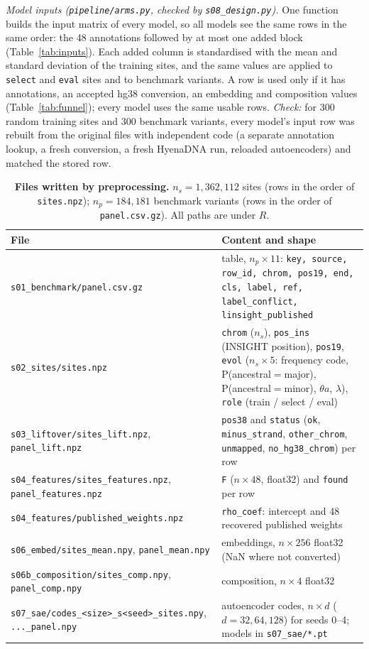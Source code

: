 \documentclass[11pt]{article}
\newcommand{\file}[1]{\nolinkurl{#1}}
\begin{document}
\emph{Model inputs (\file{pipeline/arms.py}, checked by \file{s08_design.py}).} One function builds the input
matrix of every model, so all models see the same rows in the same order: the 48 annotations followed by at
most one added block (Table~\ref{tab:inputs}). Each added column is standardised with the mean and standard
deviation of the training sites, and the same values are applied to \texttt{select} and \texttt{eval} sites
and to benchmark variants. A row is used only if it has annotations, an accepted hg38 conversion, an
embedding and composition values (Table~\ref{tab:funnel}); every model uses the same usable rows.
\emph{Check:} for 300 random training sites and 300 benchmark variants, every model's input row was rebuilt
from the original files with independent code (a separate annotation lookup, a fresh conversion, a fresh
HyenaDNA run, reloaded autoencoders) and matched the stored row.

\begin{table}[t]
\centering\footnotesize
\caption{\textbf{Files written by preprocessing.} $n_s=1{,}362{,}112$ sites (rows in the order of
\file{sites.npz}); $n_p=184{,}181$ benchmark variants (rows in the order of \file{panel.csv.gz}). All paths
are under $R$.}
\label{tab:files}
\begin{tabularx}{\textwidth}{@{}>{\raggedright\arraybackslash}p{4.9cm} >{\raggedright\arraybackslash}X@{}}
\toprule
File & Content and shape \\
\midrule
\file{s01_benchmark/panel.csv.gz} & table, $n_p\times11$: \texttt{key, source, row\_id, chrom, pos19, end, cls, label, ref, label\_conflict, linsight\_published} \\
\file{s02_sites/sites.npz} & \texttt{chrom} ($n_s$), \texttt{pos\_ins} (INSIGHT position), \texttt{pos19}, \texttt{evol} ($n_s\times5$: frequency code, P(ancestral${}={}$major), P(ancestral${}={}$minor), $\theta a$, $\lambda$), \texttt{role} (train / select / eval) \\
\file{s03_liftover/sites_lift.npz}, \file{panel_lift.npz} & \texttt{pos38} and \texttt{status} (\texttt{ok}, \texttt{minus\_strand}, \texttt{other\_chrom}, \texttt{unmapped}, \texttt{no\_hg38\_chrom}) per row \\
\file{s04_features/sites_features.npz}, \file{panel_features.npz} & \texttt{F} ($n\times48$, float32) and \texttt{found} per row \\
\file{s04_features/published_weights.npz} & \texttt{rho\_coef}: intercept and 48 recovered published weights \\
\file{s06_embed/sites_mean.npy}, \file{panel_mean.npy} & embeddings, $n\times256$ float32 (NaN where not converted) \\
\file{s06b_composition/sites_comp.npy}, \file{panel_comp.npy} & composition, $n\times4$ float32 \\
\file{s07_sae/codes_<size>_s<seed>_sites.npy}, \file{..._panel.npy} & autoencoder codes, $n\times d$ ($d=32,64,128$) for seeds 0--4; models in \file{s07_sae/*.pt} \\
\bottomrule
\end{tabularx}
\end{table}
\end{document}
